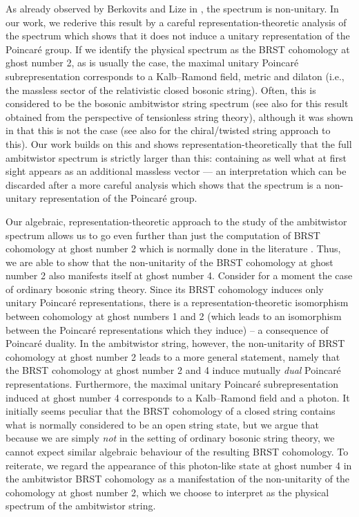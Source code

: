 \documentclass[11pt,reqno,a4paper,final]{amsart}
\theoremstyle{plain}
\theoremstyle{definition}
\newcommand{\1}{\mathbb{1}}
\numberwithin{equation}{section}
\begin{document}
As already observed by Berkovits and Lize in
\cite{Berkovits:2018jvm}, the spectrum is non-unitary.  In our work,
we rederive this result by a careful representation-theoretic analysis of the spectrum which shows that it does not induce a unitary representation of the Poincaré group.  If we identify the physical spectrum as the BRST cohomology at ghost number 2, as is usually the case, the maximal unitary Poincaré subrepresentation corresponds to a Kalb--Ramond field, metric and dilaton (i.e., the massless sector of the relativistic closed bosonic string). Often, this is considered to be the bosonic ambitwistor string spectrum \cite{MasonSkinner, Huang:2016bdd, Casali:2016atr, Lee:2017utr} (see also \cite{Gamboa:1989zc, Bagchi:2020fpr} for this result obtained from the perspective of tensionless string theory), although it was shown in \cite{Berkovits:2018jvm} that this is not the case (see also \cite{LipinskiJusinskas:2019cej, Carabine:2023yxv} for the chiral/twisted string approach to this). 
Our work builds on this and shows representation-theoretically that the full ambitwistor spectrum is strictly larger than this: containing as well
what at first sight appears as an additional massless vector --- an
interpretation which can be discarded after a more careful analysis
which shows that the spectrum is a non-unitary representation of the
Poincaré group.

Our algebraic, representation-theoretic approach to the study of the
ambitwistor spectrum allows us to go even further than just the
computation of BRST cohomology at ghost number 2 which is normally
done in the literature \cite{MasonSkinner, Berkovits:2018jvm}. Thus,
we are able to show that the non-unitarity of the BRST cohomology at
ghost number 2 also manifests itself at ghost number 4. Consider for a
moment the case of ordinary bosonic string theory. Since its BRST
cohomology induces only unitary Poincaré representations, there is a
representation-theoretic isomorphism between cohomology at ghost
numbers 1 and 2 (which leads to an isomorphism between the Poincaré
representations which they induce) -- a consequence of Poincaré
duality. In the ambitwistor string, however, the non-unitarity of BRST
cohomology at ghost number 2 leads to a more general statement, namely
that the BRST cohomology at ghost number 2 and 4 induce mutually
\emph{dual} Poincaré representations. Furthermore, the maximal unitary
Poincaré subrepresentation induced at ghost number 4 corresponds to a
Kalb--Ramond field and a photon. It initially seems peculiar that the
BRST cohomology of a closed string contains what is normally
considered to be an open string state, but we argue that because we
are simply \emph{not} in the setting of ordinary bosonic string
theory, we cannot expect similar algebraic behaviour of the resulting
BRST cohomology. To reiterate, we regard the appearance of this
photon-like state at ghost number 4 in the ambitwistor BRST cohomology
as a manifestation of the non-unitarity of the cohomology at ghost
number 2, which we choose to interpret as the physical spectrum of the
ambitwistor string.
\end{document}

